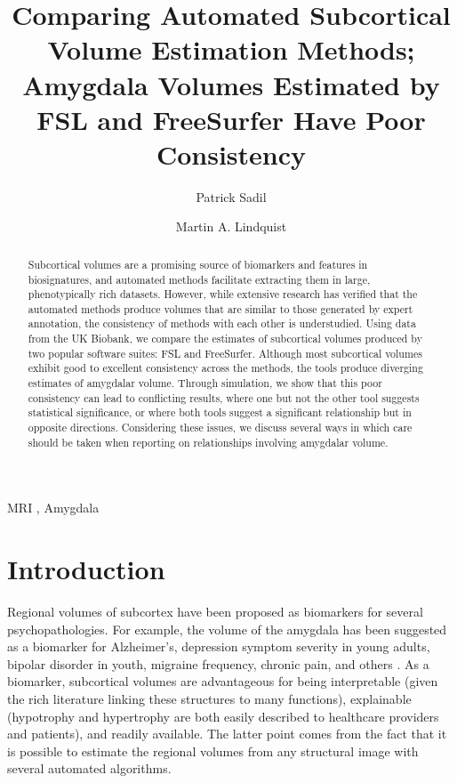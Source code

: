 \documentclass[
  authoryear,
  preprint,
  1p]{elsarticle}
\begin{document}
\begin{frontmatter}
\title{Comparing Automated Subcortical Volume Estimation Methods;
Amygdala Volumes Estimated by FSL and FreeSurfer Have Poor Consistency}
\author[1]{Patrick Sadil%
%
}
\author[1]{Martin A. Lindquist%
%
}





        
\begin{abstract}
Subcortical volumes are a promising source of biomarkers and features in
biosignatures, and automated methods facilitate extracting them in
large, phenotypically rich datasets. However, while extensive research
has verified that the automated methods produce volumes that are similar
to those generated by expert annotation, the consistency of methods with
each other is understudied. Using data from the UK Biobank, we compare
the estimates of subcortical volumes produced by two popular software
suites: FSL and FreeSurfer. Although most subcortical volumes exhibit
good to excellent consistency across the methods, the tools produce
diverging estimates of amygdalar volume. Through simulation, we show
that this poor consistency can lead to conflicting results, where one
but not the other tool suggests statistical significance, or where both
tools suggest a significant relationship but in opposite directions.
Considering these issues, we discuss several ways in which care should
be taken when reporting on relationships involving amygdalar volume.
\end{abstract}





\begin{keyword}
    MRI \sep 
    Amygdala
\end{keyword}
\end{frontmatter}
    
\section{Introduction}\label{introduction}

Regional volumes of subcortex have been proposed as biomarkers for
several psychopathologies. For example, the volume of the amygdala has
been suggested as a biomarker for Alzheimer's, depression symptom
severity in young adults, bipolar disorder in youth, migraine frequency,
chronic pain, and others
\citep{daftary_relationship_2019, khatri_alzheimers_2022, pfeifer_meta-analysis_2008, liu_hippocampus_2017, vachon-presseau_corticolimbic_2016, rogers_smaller_2009, ruocco_amygdala_2012, szeszko_amygdala_2004}.
As a biomarker, subcortical volumes are advantageous for being
interpretable (given the rich literature linking these structures to
many functions), explainable (hypotrophy and hypertrophy are both easily
described to healthcare providers and patients), and readily available.
The latter point comes from the fact that it is possible to estimate the
regional volumes from any structural image with several automated
algorithms.
\end{document}

